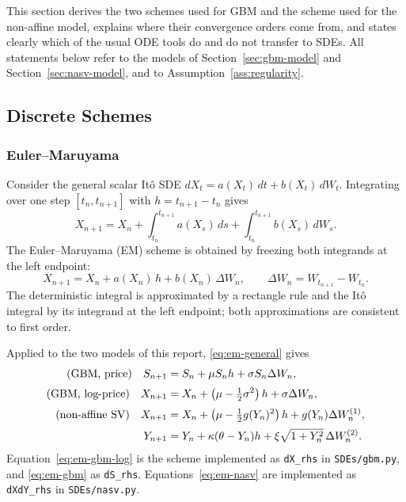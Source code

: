 \documentclass[11pt,a4paper]{article}
\theoremstyle{definition}
\theoremstyle{remark}
\begin{document}
This section derives the two schemes used for GBM and the scheme used for the
non-affine model, explains where their convergence orders come from, and states
clearly which of the usual ODE tools do and do not transfer to SDEs. All
statements below refer to the models of Section~\ref{sec:gbm-model} and
Section~\ref{sec:nasv-model}, and to Assumption~\ref{ass:regularity}.

\subsection{Discrete Schemes}
\label{sec:schemes}

\subsubsection{Euler--Maruyama}

Consider the general scalar It\^o SDE $dX_t = a(X_t)\,dt + b(X_t)\,dW_t$.
Integrating over one step $[t_n, t_{n+1}]$ with $h = t_{n+1} - t_n$ gives
\begin{equation}
    X_{n+1} = X_n + \int_{t_n}^{t_{n+1}} a(X_s)\, ds
                   + \int_{t_n}^{t_{n+1}} b(X_s)\, dW_s .
    \label{eq:integral-form}
\end{equation}
The Euler--Maruyama (EM) scheme is obtained by freezing both integrands at the
left endpoint:
\begin{equation}
    X_{n+1} = X_n + a(X_n)\, h + b(X_n)\, \Delta W_n,
    \qquad \Delta W_n = W_{t_{n+1}} - W_{t_n} .
    \label{eq:em-general}
\end{equation}
The deterministic integral is approximated by a rectangle rule and the
It\^o integral by its integrand at the left endpoint; both approximations are
consistent to first order.

Applied to the two models of this report, \eqref{eq:em-general} gives
\begin{align}
    \text{(GBM, price)} \quad
    S_{n+1} &= S_n + \mu S_n h + \sigma S_n \Delta W_n,
    \label{eq:em-gbm} \\[2pt]
    \text{(GBM, log-price)} \quad
    X_{n+1} &= X_n + \left( \mu - \tfrac12 \sigma^2 \right) h
               + \sigma \Delta W_n,
    \label{eq:em-gbm-log} \\[2pt]
    \text{(non-affine SV)} \quad
    X_{n+1} &= X_n + \left( \mu - \tfrac12 g(Y_n)^2 \right) h
               + g(Y_n) \Delta W_n^{(1)}, \notag \\[2pt]
    Y_{n+1} &= Y_n + \kappa (\theta - Y_n) h
               + \xi \sqrt{1 + Y_n^{2}}\, \Delta W_n^{(2)} .
    \label{eq:em-nasv}
\end{align}
Equation~\eqref{eq:em-gbm-log} is the scheme implemented as \texttt{dX\_rhs} in
\texttt{SDEs/gbm.py}, and \eqref{eq:em-gbm} as \texttt{dS\_rhs}.
Equations~\eqref{eq:em-nasv} are implemented as \texttt{dXdY\_rhs} in
\texttt{SDEs/nasv.py}.
\end{document}
